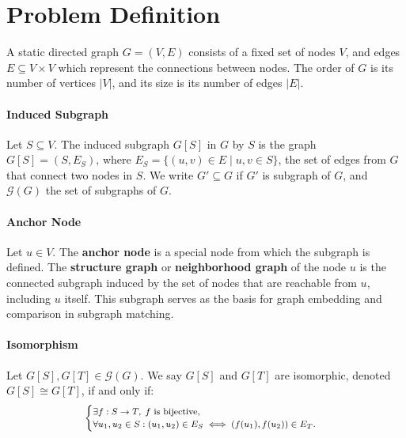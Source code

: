 \documentclass[pdflatex,sn-mathphys-num]{sn-jnl}%
\theoremstyle{thmstyleone}%
\theoremstyle{thmstyletwo}%
\theoremstyle{thmstylethree}%
\begin{document}

\section{Problem Definition}
\label{sec:problem}
A static directed graph $G = (V, E)$ consists of a fixed set of nodes $V$, and edges $E \subseteq V \times V$ which represent the connections between nodes.
The order of $G$ is its number of vertices $|V|$, and its size is its number of edges $|E|$.

\paragraph{Induced Subgraph}
Let $S \subseteq V$. The induced subgraph $G[S]$ in $G$ by $S$ is the graph $G[S] = (S, E_S)$, where $E_S = \{(u, v) \in E \mid u, v \in S\}$, the set of edges from $G$ that connect two nodes in $S$. We write $G' \subseteq G$ if $G'$ is subgraph of $G$, and $\mathcal{G}(G)$ the set of subgraphs of $G$.

\paragraph{Anchor Node}
Let $u \in V$. The \textbf{anchor node} is a special node from which the subgraph is defined. The \textbf{structure graph} or \textbf{neighborhood graph} of the node $u$ is the connected subgraph induced by the set of nodes that are reachable from $u$, including $u$ itself. This subgraph serves as the basis for graph embedding and comparison in subgraph matching.

\paragraph{Isomorphism}
Let $G[S], G[T] \in \mathcal{G}(G)$. We say $G[S]$ and $G[T]$ are isomorphic, denoted $G[S] \cong G[T]$, if and only if:
\[\footnotesize
\begin{cases}
    \exists f: S \to T, \; f \text{ is bijective}, \\
    \forall u_1, u_2 \in S: (u_1, u_2) \in E_S \iff (f(u_1), f(u_2)) \in E_T.
\end{cases}
\]
\end{document}
